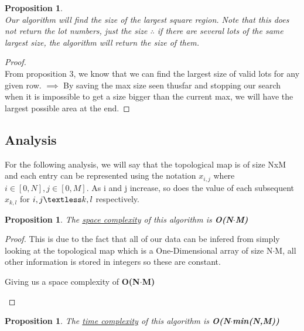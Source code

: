 \documentclass[12pt]{article}
\newtheorem{proposition}[theorem]{Proposition}
\begin{document}
\begin{proposition}
~ \\ \indent Our algorithm will find the size of the largest square region. Note that this does
not return the lot numbers, just the size $\therefore$ if there are several lots of the same
largest size, the algorithm will return the size of them.
\end{proposition}

\begin{proof}
~ \\ \indent From proposition 3, we know that we can find the largest size of valid lots for any given row. $\implies$
By saving the max size seen thusfar and stopping  our search when it is impossible to get a size bigger than the current
max, we will have the largest possible area at the end.
\end{proof}

\subsection{Analysis}
For the following analysis, we will say that the topological map is of size NxM and each entry
can be represented using the notation $x_{i,j}$ where $i \in [0,N], j \in [0,M]$. As i and j
increase, so does the value of each subsequent $x_{k,l}$ for $i,j \textless k,l$ respectively.

\begin{proposition}
\label{numq}
The \underline{space complexity} of this algorithm is \textbf{O(N$\cdot$M)}
\end{proposition}

\begin{proof}
This is due to the fact that all of our data can be infered from simply looking at the topological map which is a
One-Dimensional array of size N$\cdot$M, all other information is stored in integers so these are constant. \\
\begin{center}
    Giving us a space complexity of \textbf{O(N$\cdot$M)}
\end{center}
\end{proof}

\begin{proposition}
\label{numq}
The \underline{time complexity} of this algorithm is \textbf{O(N$\cdot$min(N,M))}
\end{proposition}
\end{document}
